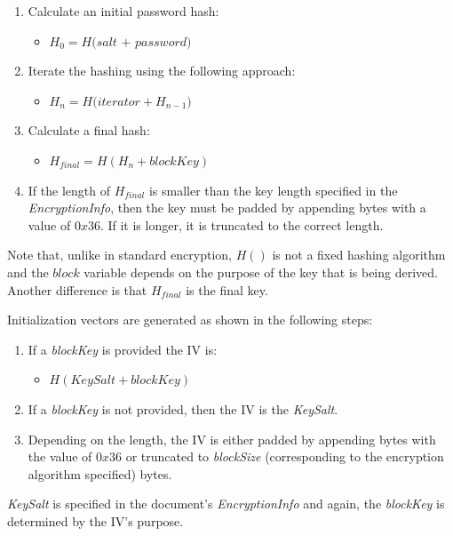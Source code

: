 \documentclass[11pt,oneside]{fithesis2}
\begin{document}
\begin{enumerate}
\item{Calculate an initial password hash:}
	\begin{itemize}
		\item{$H_0 =\textit{H(salt + password)}$}
	\end{itemize}
\item{Iterate the hashing using the following approach:}
	\begin{itemize}
		\item{$H_n = \textit{H(iterator} + H_{n-1})$}
	\end{itemize}
\item{Calculate a final hash:}
	\begin{itemize}
		\item{$H_{final} = \textit{H}(H_n + blockKey)$}
	\end{itemize}
\item{If the length of $H_{final}$ is smaller than the key length specified in the \textit{EncryptionInfo}, then the key must be padded by appending bytes with a value of $0x36$. If it is longer, it is truncated to the correct length.}
\end{enumerate}

Note that, unlike in standard encryption, $H()$ is not a fixed hashing algorithm and the $block$ variable depends on the purpose of the key that is being derived. Another difference is that $H_{final}$ is the final key.

Initialization vectors are generated as shown in the following steps:
\begin{enumerate}\label{IVgen}
	\item{If a \textit{blockKey} is provided the IV is:}
	\begin{itemize}
		\item{$H(KeySalt + blockKey)$}
	\end{itemize}
	\item{If a \textit{blockKey} is not provided, then the IV is the \textit{KeySalt}.}
	\item{Depending on the length, the IV is either padded by appending bytes with the value of $0x36$ or truncated to \textit{blockSize} (corresponding to the encryption algorithm specified) bytes.}
\end{enumerate}

\textit{KeySalt} is specified in the document's \textit{EncryptionInfo} and again, the \textit{blockKey} is determined by the IV's purpose.
\end{document}
